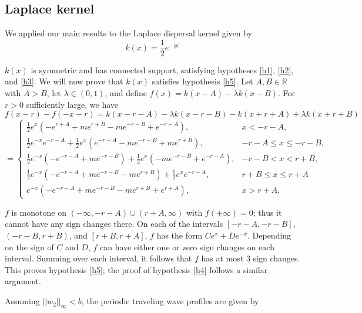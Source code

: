 \documentclass[11pt]{article}
\theoremstyle{definition}
\numberwithin{equation}{section}
\numberwithin{thm}{section}
\begin{document}
\subsection{Laplace kernel} 
We applied our main results to the Laplace dispersal kernel given by
\begin{equation} \label{laplacekernel}
k(x) = \frac{1}{2} e^{-|x|}
\end{equation}

$k(x)$ is symmetric and has connected support, satisfying hypotheses \ref{h1}, \ref{h2}, and \ref{h3}. We will now prove that $k(x)$ satisfies hypothesis \ref{h5}. Let $A,B\in\mathbb R$ with $A>B$, let $\lambda \in (0,1)$, and define $f(x) = k(x-A) - \lambda k(x-B)$. For $r>0$ sufficiently large, we have
$$
f(x-r) - f(-x-r) = k(x-r-A) - \lambda k(x-r-B) - k(x+r+A) + \lambda k(x+r+B)
$$
$$=  \begin{cases}
\frac{1}{2} e^{x}\left(-e^{r+A}+me^{r+B}-me^{-r-B}+e^{-r-A}\right) , & x < -r-A, \\
\frac{1}{2}e^{-x}e^{-r-A}+\frac{1}{2}e^{x}\left(e^{-r-A}-me^{-r-B}+me^{r+B}\right) , & -r-A \leq x \leq -r-B, \\
\frac{1}{2}e^{-x}\left(-e^{-r-A}+me^{-r-B}\right)+\frac{1}{2}e^{x}\left(-me^{-r-B}+e^{-r-A}\right) , & -r-B < x < r+B, \\
\frac{1}{2}e^{-x}\left(-e^{-r-A}+me^{-r-B}-me^{r+B}\right)+\frac{1}{2}e^{x}e^{-r-A}, & r+B \leq x \leq r+A \\
e^{-x}\left(-e^{-r-A}+me^{-r-B}-me^{r+B}+e^{r+A}\right), & x > r+A.
\end{cases}
$$

$f$ is monotone on $(-\infty,-r-A)\cup(r+A,\infty)$ with $f(\pm\infty)=0$; thus it cannot have any sign changes there. On each of the intervals $[-r-A,-r-B]$, $(-r-B,r+B)$, and $[r+B,r+A]$, $f$ has the form $Ce^x+De^{-x}$. Depending on the sign of $C$ and $D$, $f$ can have either one or zero sign changes on each interval. Summing over each interval, it follows that $f$ has at most $3$ sign changes. This proves hypothesis \ref{h5}; the proof of hypothesis \ref{h4} follows a similar argument.

 Assuming $||w_2||_\infty<b$, the periodic traveling wave profiles are given by
\end{document}
